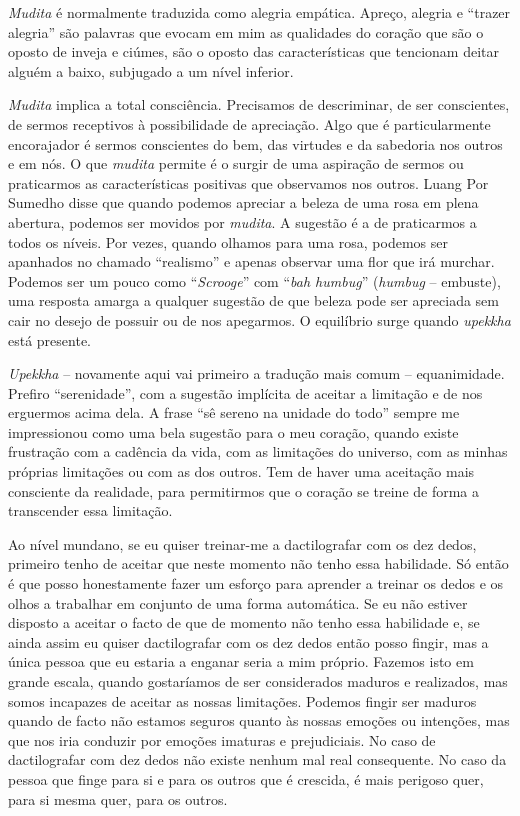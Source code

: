 \emph{Mudita} é normalmente traduzida como alegria empática. Apreço,
alegria e ``trazer alegria'' são palavras que evocam em mim as
qualidades do coração que são o oposto de inveja e ciúmes, são o oposto
das características que tencionam deitar alguém a baixo, subjugado a um
nível inferior.

\emph{Mudita} implica a total consciência. Precisamos de descriminar, de
ser conscientes, de sermos receptivos à possibilidade de apreciação.
Algo que é particularmente encorajador é sermos conscientes do bem, das
virtudes e da sabedoria nos outros e em nós. O que \emph{mudita} permite
é o surgir de uma aspiração de sermos ou praticarmos as características
positivas que observamos nos outros. Luang Por Sumedho disse que quando
podemos apreciar a beleza de uma rosa em plena abertura, podemos ser
movidos por \emph{mudita}. A sugestão é a de praticarmos a todos os
níveis. Por vezes, quando olhamos para uma rosa, podemos ser apanhados
no chamado ``realismo'' e apenas observar uma flor que irá murchar.
Podemos ser um pouco como ``\emph{Scrooge}'' com ``\emph{bah humbug}''
(\emph{humbug} -- embuste), uma resposta amarga a qualquer sugestão de
que beleza pode ser apreciada sem cair no desejo de possuir ou de nos
apegarmos. O equilíbrio surge quando \emph{upekkha} está presente.

\emph{Upekkha} -- novamente aqui vai primeiro a tradução mais comum --
equanimidade. Prefiro ``serenidade'', com a sugestão implícita de
aceitar a limitação e de nos erguermos acima dela. A frase ``sê sereno
na unidade do todo'' sempre me impressionou como uma bela sugestão para
o meu coração, quando existe frustração com a cadência da vida, com as
limitações do universo, com as minhas próprias limitações ou com as dos
outros. Tem de haver uma aceitação mais consciente da realidade, para
permitirmos que o coração se treine de forma a transcender essa
limitação.

Ao nível mundano, se eu quiser treinar-me a dactilografar com os dez
dedos, primeiro tenho de aceitar que neste momento não tenho essa
habilidade. Só então é que posso honestamente fazer um esforço para
aprender a treinar os dedos e os olhos a trabalhar em conjunto de uma
forma automática. Se eu não estiver disposto a aceitar o facto de que de
momento não tenho essa habilidade e, se ainda assim eu quiser
dactilografar com os dez dedos então posso fingir, mas a única pessoa
que eu estaria a enganar seria a mim próprio. Fazemos isto em grande
escala, quando gostaríamos de ser considerados maduros e realizados, mas
somos incapazes de aceitar as nossas limitações. Podemos fingir ser
maduros quando de facto não estamos seguros quanto às nossas emoções ou
intenções, mas que nos iria conduzir por emoções imaturas e
prejudiciais. No caso de dactilografar com dez dedos não existe nenhum
mal real consequente. No caso da pessoa que finge para si e para os
outros que é crescida, é mais perigoso quer, para si mesma quer, para os
outros.


